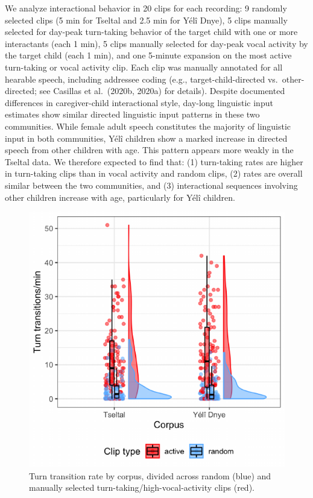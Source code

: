 \documentclass[10pt, letterpaper]{article}
\newenvironment{CodeChunk}{}{}
\begin{document}
We analyze interactional behavior in 20 clips for each recording: 9
randomly selected clips (5 min for Tseltal and 2.5 min for Yélî Dnye), 5
clips manually selected for day-peak turn-taking behavior of the target
child with one or more interactants (each 1 min), 5 clips manually
selected for day-peak vocal activity by the target child (each 1 min),
and one 5-minute expansion on the most active turn-taking or vocal
activity clip. Each clip was manually annotated for all hearable speech,
including addressee coding (e.g., target-child-directed
vs.~other-directed; see Casillas et al.~(2020b, 2020a) for details).
Despite documented differences in caregiver-child interactional style,
day-long linguistic input estimates show similar directed linguistic
input patterns in these two communities. While female adult speech
constitutes the majority of linguistic input in both communities, Yélî
children show a marked increase in directed speech from other children
with age. This pattern appears more weakly in the Tseltal data. We
therefore expected to find that: (1) turn-taking rates are higher in
turn-taking clips than in vocal activity and random clips, (2) rates are
overall similar between the two communities, and (3) interactional
sequences involving other children increase with age, particularly for
Yélî children.

\begin{CodeChunk}
\begin{figure}[h]

{\centering \includegraphics{figs/tseyel.ttr.fig-1} 

}

\caption[Turn transition rate by corpus, divided across random (blue) and manually selected turn-taking/high-vocal-activity clips (red)]{Turn transition rate by corpus, divided across random (blue) and manually selected turn-taking/high-vocal-activity clips (red).}\label{fig:tseyel.ttr.fig}
\end{figure}
\end{CodeChunk}
\end{document}
